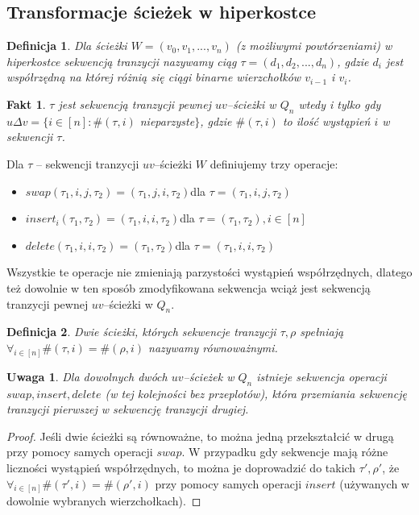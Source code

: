 \documentclass{pracamgr}
\newtheorem{defi}{Definicja}[section] %
\newtheorem{remark}[theorem]{Uwaga}
\newtheorem{fact}[theorem]{Fakt}
\begin{document}
  \subsection{Transformacje ścieżek w hiperkostce}
   \begin{defi}\label{sekwencja tranzycji}
     Dla ścieżki $W=(v_0,v_1,...,v_n)$ (z możliwymi powtórzeniami) w hiperkostce \emph{sekwencją tranzycji} nazywamy ciąg $\tau=(d_1,d_2,...,d_n)$,
     gdzie $d_i$ jest współrzędną na której różnią się ciągi binarne wierzchołków $v_{i-1}$ i $v_i$.
    \end{defi}
    \begin{fact}\label{sekwencja tranzycji - parzystość}
     $\tau$ jest sekwencją tranzycji pewnej $uv$--ścieżki w $Q_n$ wtedy i tylko gdy\newline
     $u\Delta v=\{i\in[n]:\#(\tau,i)$ nieparzyste$\}$,
     gdzie $\#(\tau,i)$ to ilość wystąpień $i$ w sekwencji $\tau$.
    \end{fact}
    Dla $\tau$ -- sekwencji tranzycji $uv$--ścieżki $W$ definiujemy trzy operacje:
    \begin{itemize}
     \item $swap(\tau_1,i,j,\tau_2)=(\tau_1,j,i,\tau_2)$\quad dla $\tau=(\tau_1,i,j,\tau_2)$
     \item $insert_i(\tau_1,\tau_2)=(\tau_1,i,i,\tau_2)$\quad dla $\tau=(\tau_1,\tau_2),i\in[n]$
     \item $delete(\tau_1,i,i,\tau_2)=(\tau_1,\tau_2)$\quad dla $\tau=(\tau_1,i,i,\tau_2)$
    \end{itemize}
    Wszystkie te operacje nie zmieniają parzystości wystąpień współrzędnych, dlatego też dowolnie w ten sposób zmodyfikowana sekwencja
    wciąż jest sekwencją tranzycji pewnej $uv$--ścieżki w $Q_n$.
    \begin{defi}\label{sciezki rownowazne}
     Dwie ścieżki, których sekwencje tranzycji $\tau,\rho$ spełniają $\forall_{i\in[n]}\#(\tau,i)=\#(\rho,i)$ nazywamy \emph{równoważnymi}.
    \end{defi}
    \begin{remark}\label{przeksztalcanie sciezek}
     Dla dowolnych dwóch $uv$--ścieżek w $Q_n$ istnieje sekwencja operacji $swap,insert,delete$ (w tej kolejności bez przeplotów),
     która przemiania sekwencję tranzycji pierwszej w sekwencję tranzycji drugiej.
    \end{remark}
    \begin{proof}
     Jeśli dwie ścieżki są równoważne, to można jedną przekształcić w drugą przy pomocy samych operacji $swap$.\newline
     W przypadku gdy sekwencje mają różne liczności wystąpień współrzędnych, to można je doprowadzić do takich $\tau',\rho'$,
     że $\forall_{i\in[n]}\#(\tau',i)=\#(\rho',i)$ przy pomocy samych operacji $insert$ (używanych w dowolnie wybranych wierzchołkach).
    \end{proof}
\end{document}
